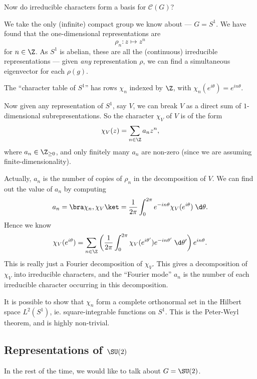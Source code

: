 \documentclass[a4paper]{article}
\begin{document}
Now do irreducible characters form a basis for $\mathcal{C}(G)$?
\begin{eg}
  We take the only (infinite) compact group we know about --- $G = S^1$. We have found that the one-dimensional representations are
  \[
    \rho_n: z \mapsto z^n
  \]
  for $n \in \Z$. As $S^1$ is abelian, these are all the (continuous) irreducible representations --- given \emph{any} representation $\rho$, we can find a simultaneous eigenvector for each $\rho(g)$.

  The ``character table of $S^1$'' has rows $\chi_n$ indexed by $\Z$, with $\chi_n(e^{i\theta}) = e^{in\theta}$.

  Now given any representation of $S^1$, say $V$, we can break $V$ as a direct sum of $1$-dimensional subrepresentations. So the character $\chi_V$ of $V$ is of the form
  \[
    \chi_V(z) = \sum_{n \in \Z} a_n z^n,
  \]
  where $a_n \in \Z_{\geq 0}$, and only finitely many $a_n$ are non-zero (since we are assuming finite-dimensionality).

  Actually, $a_n$ is the number of copies of $\rho_n$ in the decomposition of $V$. We can find out the value of $a_n$ by computing
  \[
    a_n = \bra \chi_n, \chi_V\ket = \frac{1}{2\pi} \int_0^{2\pi} e^{-in\theta}\chi_V(e^{i\theta})\;\d \theta.
  \]
  Hence we know
  \[
    \chi_V(e^{i\theta}) = \sum_{n \in \Z} \left(\frac{1}{2\pi} \int_0^{2\pi} \chi_V(e^{i\theta'}) e^{-in\theta'}\;\d \theta'\right) e^{in\theta}.
  \]
  This is really just a Fourier decomposition of $\chi_V$. This gives a decomposition of $\chi_V$ into irreducible characters, and the ``Fourier mode'' $a_n$ is the number of each irreducible character occurring in this decomposition.

  It is possible to show that $\chi_n$ form a complete orthonormal set in the Hilbert space $L^2(S^1)$, ie. square-integrable functions on $S^1$. This is the Peter-Weyl theorem, and is highly non-trivial.
\end{eg}

\subsection{Representations of \texorpdfstring{$\SU(2)$}{SU(2)}}
In the rest of the time, we would like to talk about $G = \SU(2)$.
\end{document}

